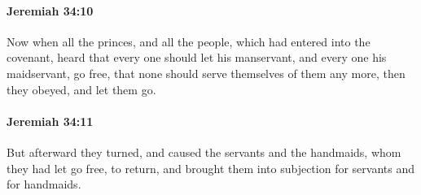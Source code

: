 		\paragraph{Jeremiah 34:10} %
			\label{JEREMIAH-34-10}

			Now when all the princes, and all the people, which had entered into the covenant, heard that every one should let his manservant, and every one his maidservant, go free, that none should serve themselves of them any more, then they obeyed, and let them go.


		\paragraph{Jeremiah 34:11} %
			\label{JEREMIAH-34-11}

			But afterward they turned, and caused the servants and the handmaids, whom they had let go free, to return, and brought them into subjection for servants and for handmaids.


